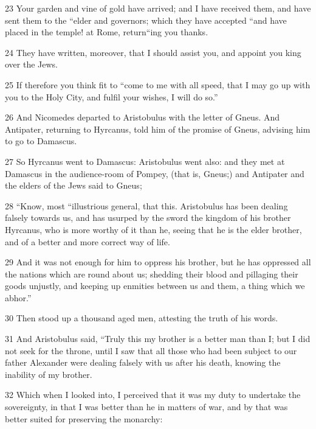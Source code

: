 \par 23 Your garden and vine of gold have arrived; and I have received them, and have sent them to the “elder and governors; which they have accepted “and have placed in the temple! at Rome, return“ing you thanks.

\par 24 They have written, moreover, that I should assist you, and appoint you king over the Jews. 

\par 25 If therefore you think fit to “come to me with all speed, that I may go up with you to the Holy City, and fulfil your wishes, I will do so.” 

\par 26 And Nicomedes departed to Aristobulus with the letter of Gneus. And Antipater, returning to Hyrcanus, told him of the promise of Gneus, advising him to go to Damascus. 

\par 27 So Hyrcanus went to Damascus: Aristobulus went also: and they met at Damascus in the audience-room of Pompey, (that is, Gneus;) and Antipater and the elders of the Jews said to Gneus; 

\par 28 “Know, most “illustrious general, that this. Aristobulus has been dealing falsely towards us, and has usurped by the sword the kingdom of his brother Hyrcanus, who is more worthy of it than he, seeing that he is the elder brother, and of a better and more correct way of life. 

\par 29 And it was not enough for him to oppress his brother, but he has oppressed all the nations which are round about us; shedding their blood and pillaging their goods unjustly, and keeping up enmities between us and them, a thing which we abhor.” 

\par 30 Then stood up a thousand aged men, attesting the truth of his words. 

\par 31 And Aristobulus said, “Truly this my brother is a better man than I; but I did not seek for the throne, until I saw that all those who had been subject to our father Alexander were dealing falsely with us after his death, knowing the inability of my brother. 

\par 32 Which when I looked into, I perceived that it was my duty to undertake the sovereignty, in that I was better than he in matters of war, and by that was better suited for preserving the monarchy: 

